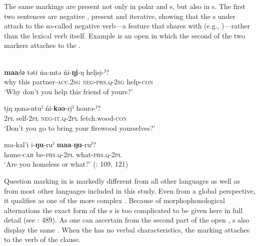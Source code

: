 \noindent The same markings are present not only in polar and s, but also in s. The first two sentences are negative , present and iterative, showing that the s under  attach to the so-called negative verb—a feature that  shares with  (e.g., \citealt{Hölzl2015a})—rather than the lexical verb itself. Example  is an open  in which the second of the two markers attaches to the .

\ea%
    \label{ex:ural:2}
    \\
    \ea
    \gll \textbf{{maa$\delta ə$}} təti  ńa-mtə      ńi-\textbf{{ŋ}}\textbf{{i̮}}-ŋ      heli̮si̮-ˀ?\\
    why  this  partner-\textsc{acc}.2\textsc{sg}  \textsc{neg}-\textsc{prs}.\textsc{q}-2\textsc{sg}  help-\textsc{con}\\
    \glt ‘Why don’t you help this friend of yours?’
    
    \ex
    \gll ti̮ŋ  ŋonə-ntuˀ  ńi-\textbf{{kəə}}{-r}i̮ˀ  hourə-ˀ?\\
    2\textsc{pl}  self-2\textsc{pl}  \textsc{neg}-\textsc{it}.\textsc{q}-2\textsc{pl}  fetch.wood-\textsc{con}\\
    \glt ‘Don’t you go to bring your firewood yourselves?’
    
    \ex
    \gll ma-kal’i  i-\textbf{{ŋu}}{-ruˀ} \textbf{{maa}}-\textbf{{ŋu}}{-ruˀ?}\\
    home-\textsc{car}  be-\textsc{prs}.\textsc{q}-2\textsc{pl}  what-\textsc{prs}.\textsc{q}-2\textsc{pl}\\
    \glt ‘Are you homeless or what?’ (\citealt{Gusev2015a}: 109, 121)\z\z

\clearpage %
\noindent Question marking in  is markedly different from all other  languages as well as from most other languages included in this study. Even from a global perspective, it qualifies as one of the more complex . Because of morphophonological alternations the exact form of the s is too complicated to be given here in full detail (see \citealt{Helimski1998}: 489). As one can ascertain from the second part of the open , s also display the same . When the  has no verbal characteristics, the marking attaches to the verb of the clause.

